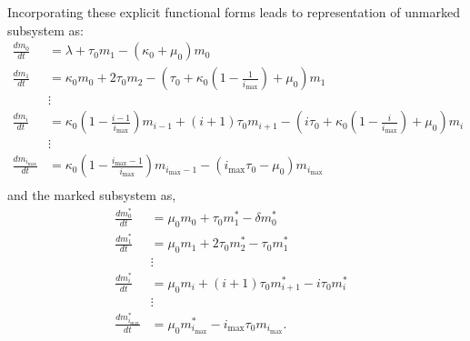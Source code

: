 \documentclass[review]{elsarticle}
\newcommand{\imax}{\ensuremath{i_{\max}}\xspace}
\begin{document}
Incorporating these explicit functional forms leads to representation of unmarked subsystem as: %
\begin{align*}
\frac{dm_{0}}{dt} &= \lambda+\tau_0 m_{1}-\left(\kappa_0 +\mu_0\right) m_{0} \\
\frac{dm_{1}}{dt} &= \kappa_0 m_{0}+2\tau_0 m_{2}-\left(\tau_0 +\kappa_0\left(1-\frac{1}{\imax}\right) +\mu_0\right) m_{1}\\
& \vdots & \\
\frac{dm_{i}}{dt} &= \kappa_0\left(1-\frac{i-1}{\imax}\right) m_{i-1}+(i+1)\tau_0 m_{i+1}-\left(i\tau_0+\kappa_0\left(1-\frac{i}{\imax}\right) + \mu_0\right) m_{i} \\
& \vdots & \\
\frac{dm_{\imax}}{dt} &= \kappa_0\left(1-\frac{\imax-1}{\imax}\right) m_{\imax-1}-\left(\imax\tau_0 -\mu_0\right) m_{\imax} \\
\end{align*}
and the marked subsystem as,
\begin{align*}
\frac{dm_{0}^{*}}{dt} &= \mu_0 m_{0}+\tau_0 m_{1}^{*}-\delta m_{0}^{*} \\
\frac{dm_{1}^{*}}{dt} &= \mu_0 m_{1}+2\tau_0 m_{2}^{*}- \tau_0 m_{1}^{*} \\
& \vdots & \\
\frac{dm_{i}^{*}}{dt} &= \mu_0 m_{i}+(i+1)\tau_0 m_{i+1}^{*}-i\tau_0m_{i}^{*} \\
& \vdots & \\
\frac{dm_{\imax}^{*}}{dt} &= \mu_0 m_{\imax}^{*}-\imax\tau_0 m_{\imax}. \\
\end{align*}
\end{document}
